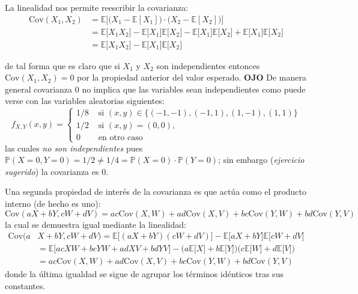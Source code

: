 \documentclass[
]{book}
\begin{document}
La linealidad nos permite reescribir la covarianza:
\begin{equation}
\begin{aligned}
\textrm{Cov}(X_1, X_2) & = \mathbb{E}\Big[ \big(X_1 - \mathbb{E}[X_1]\big) \cdot \big(X_2 - \mathbb{E}[X_2]\big) \Big] \\
& =  \mathbb{E}\Big[ X_1 X_2 \Big]  - \mathbb{E}\Big[X_1\Big]\mathbb{E}\Big[X_2\Big]   - \mathbb{E}\Big[X_1\Big]\mathbb{E}\Big[X_2\Big]  +  \mathbb{E}\Big[X_1\Big]\mathbb{E}\Big[X_2\Big] 
\\ & = \mathbb{E}\Big[ X_1 X_2 \Big] - \mathbb{E}\Big[X_1\Big]\mathbb{E}\Big[X_2\Big] 
\end{aligned}
\end{equation}

de tal forma que es claro que si \(X_1\) y \(X_2\) son independientes entonces \(\textrm{Cov}(X_1, X_2) = 0\) por la propiedad anterior del valor esperado. \textbf{OJO} De manera general covarianza \(0\) no implica que las variables sean independientes como puede verse con las variables aleatorias siguientes:
\[
f_{X,Y}(x,y) = \begin{cases}
1/8 & \text{ si } (x,y) \in \{ (-1,-1), (-1,1), (1, -1), (1,1)\} \\
1/2 & \text{ si } (x,y)  = (0,0), \\
0 & \text{ en otro caso}
\end{cases}
\]
las cuales \emph{no son independientes} pues \(\mathbb{P}(X = 0, Y = 0) = 1/2\neq 1/4 = \mathbb{P}(X = 0)\cdot \mathbb{P}(Y = 0)\); sin embargo (\emph{ejercicio sugerido}) la covarianza es \(0\).

Una segunda propiedad de interés de la covarianza es que actúa como el producto interno (de hecho es uno):
\[
\text{Cov}(a X + bY, cW + dV) = ac \text{Cov}(X,W) + ad \text{Cov}(X,V) + bc \text{Cov}(Y,W) + bd \text{Cov}(Y,V) 
\]
la cual se demuestra igual mediante la linealidad:
\begin{equation}
\begin{aligned}
\textrm{Cov}(a & X + bY, cW + dV)  = \mathbb{E}\Big[ (a X + bY) (cW + dV) \Big] - \mathbb{E}\Big[a X + bY\Big]\mathbb{E}\Big[cW + dV\Big] 
\\ & = \mathbb{E}\Big[ ac XW + bc YW + ad XV + bd YV\Big] - \bigg( a \mathbb{E}\Big[ X \Big] + b\mathbb{E}\Big[ Y\Big]\bigg)\bigg( c\mathbb{E}\Big[W\Big] + d\mathbb{E}\Big[V\Big] \bigg)
\\ & =   ac \text{Cov}(X,W) + ad \text{Cov}(X,V) + bc \text{Cov}(Y,W) + bd \text{Cov}(Y,V) 
\end{aligned}
\end{equation}
donde la última igualdad se sigue de agrupar los términos idénticos tras sus constantes.
\end{document}
